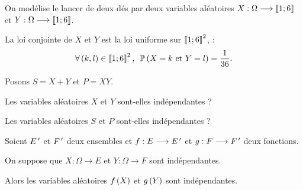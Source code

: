 \begin{dem}
\end{dem}

\begin{exoex}
On modélise le lancer de deux dés par deux variables aléatoires \(X:\Omega\longrightarrow\left\llbracket1;6\right\rrbracket\) et \(Y:\Omega\longrightarrow\left\llbracket1;6\right\rrbracket\).

La loi conjointe de \(X\) et \(Y\) est la loi uniforme sur \(\left\llbracket1;6\right\rrbracket^2\), \cad : \[\quantifs{\forall\paren{k,l}\in\interventierii{1}{6}^2}\proba{X=k\text{ et }Y=l}=\dfrac{1}{36}.\]

Posons \(S=X+Y\) et \(P=XY\).

Les variables aléatoires \(X\) et \(Y\) sont-elles indépendantes ?

Les variables aléatoires \(S\) et \(P\) sont-elles indépendantes ?
\end{exoex}

\begin{corr}
\end{corr}

\begin{prop}
Soient \(E^{\,\prime}\) et \(F^{\,\prime}\) deux ensembles et \(f:E\longrightarrow E^{\,\prime}\) et \(g:F\longrightarrow F^{\,\prime}\) deux fonctions.

On suppose que \(X:\Omega\to E\) et \(Y:\Omega\to F\) sont indépendantes.

Alors les variables aléatoires \(f\left(X\right)\) et \(g\left(Y\right)\) sont indépendantes.
\end{prop}

\begin{dem}
\end{dem}

